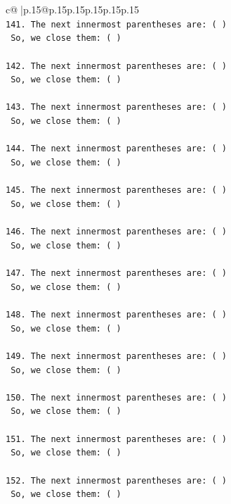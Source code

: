 \documentclass{article}
\begin{document}
{\begin{supertabular}{c@{$\;$}|p{.15\linewidth}@{}p{.15\linewidth}p{.15\linewidth}p{.15\linewidth}p{.15\linewidth}p{.15\linewidth}}
{{{\\ 
\texttt{141. The next innermost parentheses are: ( ) } \\
\texttt{    So, we close them: ( ) } \\
\\ 
\texttt{142. The next innermost parentheses are: ( ) } \\
\texttt{    So, we close them: ( ) } \\
\\ 
\texttt{143. The next innermost parentheses are: ( ) } \\
\texttt{    So, we close them: ( ) } \\
\\ 
\texttt{144. The next innermost parentheses are: ( ) } \\
\texttt{    So, we close them: ( ) } \\
\\ 
\texttt{145. The next innermost parentheses are: ( ) } \\
\texttt{    So, we close them: ( ) } \\
\\ 
\texttt{146. The next innermost parentheses are: ( ) } \\
\texttt{    So, we close them: ( ) } \\
\\ 
\texttt{147. The next innermost parentheses are: ( ) } \\
\texttt{    So, we close them: ( ) } \\
\\ 
\texttt{148. The next innermost parentheses are: ( ) } \\
\texttt{    So, we close them: ( ) } \\
\\ 
\texttt{149. The next innermost parentheses are: ( ) } \\
\texttt{    So, we close them: ( ) } \\
\\ 
\texttt{150. The next innermost parentheses are: ( ) } \\
\texttt{    So, we close them: ( ) } \\
\\ 
\texttt{151. The next innermost parentheses are: ( ) } \\
\texttt{    So, we close them: ( ) } \\
\\ 
\texttt{152. The next innermost parentheses are: ( ) } \\
\texttt{    So, we close them: ( ) } \\
}}}
\end{supertabular}}
\end{document}
